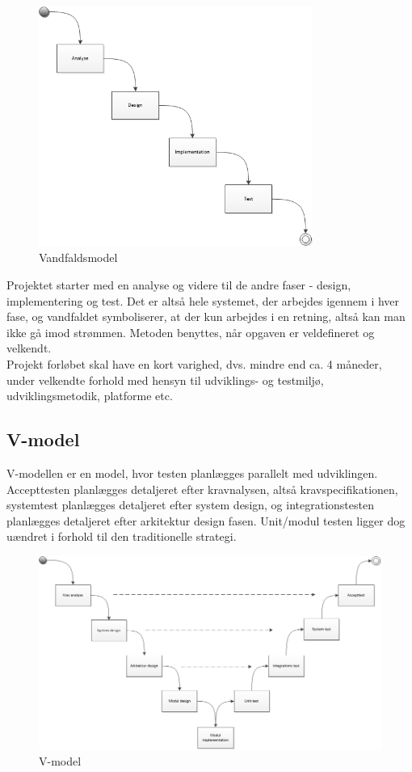 \begin{figure}[H]
	\centering
	\includegraphics[width=0.8\textwidth]{Figurer/Metode/Vandfald}
	\caption{Vandfaldsmodel}
	\label{Vandfaldsmodel}
\end{figure}
Projektet starter med en analyse og videre til de andre faser - design, implementering og test. Det er altså hele systemet, der arbejdes igennem i hver fase, og vandfaldet symboliserer, at der kun arbejdes i en retning, altså kan man ikke gå imod strømmen. Metoden benyttes, når opgaven er veldefineret og velkendt. \\
Projekt forløbet skal have en kort varighed, dvs. mindre end ca. 4 måneder, under velkendte forhold med hensyn til udviklings- og testmiljø, udviklingsmetodik, platforme etc. \cite{Projektledelse}

\subsection{V-model}
V-modellen er en model, hvor testen planlægges parallelt med udviklingen. Accepttesten planlægges detaljeret efter kravnalysen, altså kravspecifikationen, systemtest planlægges detaljeret efter system design, og integrationstesten planlægges detaljeret efter arkitektur design fasen. Unit/modul testen ligger dog uændret i forhold til den traditionelle strategi.

\begin{figure}[H]
	\centering
	\includegraphics[width=1\textwidth]{Figurer/Metode/Vmodel}
	\caption{V-model}
	\label{Vmodel}
\end{figure}

